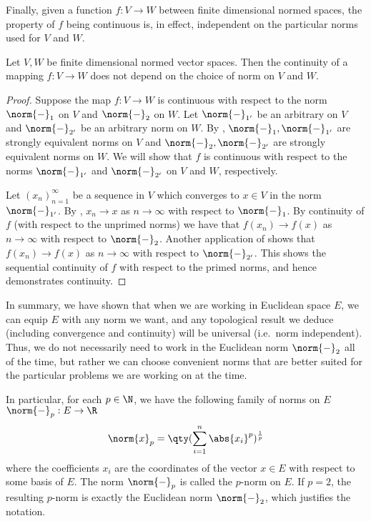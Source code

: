  Finally, given a function \( f:V \to W \) between finite dimensional normed spaces, the property of \( f \) being continuous is, in effect, independent on the particular norms used for \( V \) and \( W \).
 \begin{proposition}
   Let \( V,W \) be finite dimensional normed vector spaces. Then the continuity of a mapping \( f:V\to W \) does not depend on the choice of norm on \( V \) and \( W \).
 \end{proposition}
 \begin{proof}
   Suppose the map \( f:V\to W \) is continuous with respect to the norm \( \norm{-}_1 \) on \( V \) and \( \norm{-}_2 \) on \( W \). Let \( \norm{-}_{1'} \) be an arbitrary on \( V \) and \( \norm{-}_{2'} \) be an arbitrary norm on \( W \). By , \( \norm{-}_1,\norm{-}_{1'} \) are strongly equivalent norms on \( V \) and \( \norm{-}_2,\norm{-}_{2'} \) are strongly equivalent norms on \( W \). We will show that \( f \) is continuous with respect to the norms \( \norm{-}_{1'} \) and \( \norm{-}_{2'} \) on \( V \) and \( W \), respectively.

   \vspace{3mm}

   Let \( (x_n)_{n=1}^\infty \) be a sequence in \( V \) which converges to \( x\in V \) in the norm \( \norm{-}_{1'} \). By , \( x_n\to x \) as \( n\to\infty \) with respect to \( \norm{-}_1 \). By continuity of \( f \) (with respect to the unprimed norms) we have that \( f(x_n)\to f(x) \) as \( n\to\infty \) with respect to \( \norm{-}_2 \). Another application of  shows that \( f(x_n)\to f(x) \) as \( n\to\infty \) with respect to \( \norm{-}_{2'} \). This shows the sequential continuity of \( f \) with respect to the primed norms, and hence demonstrates continuity.
 \end{proof}

 In summary, we have shown that when we are working in Euclidean space \( E \), we can equip \( E \) with any norm we want, and any topological result we deduce (including convergence and continuity) will be universal (i.e.\ norm independent). Thus, we do not necessarily need to work in the Euclidean norm \( \norm{-}_2 \) all of the time, but rather we can choose convenient norms that are better suited for the particular problems we are working on at the time.

 \vspace{3mm}

 In particular, for each \( p\in\N \), we have the following family of norms on \( E \) \( \norm{-}_p:E\to\R \)
 \[ \norm{x}_p=\qty(\sum_{i=1}^n\abs{x_i}^p)^{\frac{1}{p}} \]
 where the coefficients \( x_i \) are the coordinates of the vector \( x\in E \) with respect to some basis of \( E \). The norm \( \norm{-}_p \) is called the \( p \)-norm on \( E \). If \( p=2 \), the resulting \( p \)-norm is exactly the Euclidean norm \( \norm{-}_2 \), which justifies the notation.

